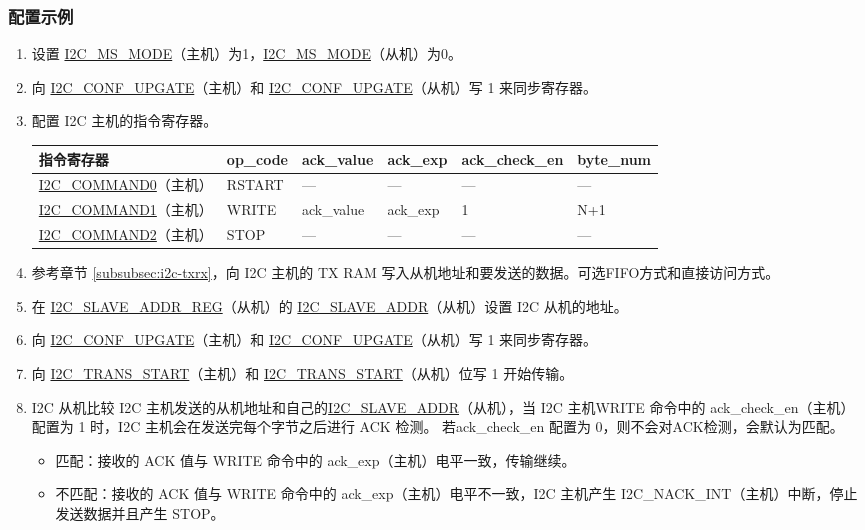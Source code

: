 \documentclass[main\_\_CN.tex]{subfiles}
\begin{document}
\subsubsection{配置示例}
\begin{enumerate}
\item 设置 \hyperref[fielddesc:I2CMSMODE]{I2C\_MS\_MODE}（主机）为1，\hyperref[fielddesc:I2CMSMODE]{I2C\_MS\_MODE}（从机）为0。
\item 向 \hyperref[fielddesc:I2CCONFUPGATE]{I2C\_CONF\_UPGATE}（主机）和 \hyperref[fielddesc:I2CCONFUPGATE]{I2C\_CONF\_UPGATE}（从机）写 1 来同步寄存器。
\clearpage
\item 配置 I2C 主机的指令寄存器。
\begin{longtable}{ | p{4cm} | p{2cm} | p{2cm} | p{2cm} |p{2cm} | p{2cm} |}
\hline\rowcolor{lightgray}
指令寄存器& op\_code & ack\_value&ack\_exp&ack\_check\_en&byte\_num  \\ \hline
\hyperref[fielddesc:I2CCOMMAND0]{I2C\_COMMAND0}（主机）& RSTART& ---&---&---&---  \\ \hline
\hyperref[fielddesc:I2CCOMMAND1]{I2C\_COMMAND1}（主机）& WRITE& ack\_value&ack\_exp&1&N+1  \\ \hline
\hyperref[fielddesc:I2CCOMMAND2]{I2C\_COMMAND2}（主机）& STOP& ---&---&---&---  \\ \hline
\end{longtable}
\item 参考章节 \ref{subsubsec:i2c-txrx}，向 I2C 主机的 TX RAM 写入从机地址和要发送的数据。可选FIFO方式和直接访问方式。
\item 在 \hyperref[regdesc:I2CSLAVEADDRREG]{I2C\_SLAVE\_ADDR\_REG}（从机）的 \hyperref[fielddesc:I2CSLAVEADDR]{I2C\_SLAVE\_ADDR}（从机）设置 I2C 从机的地址。
\item 向 \hyperref[fielddesc:I2CCONFUPGATE]{I2C\_CONF\_UPGATE}（主机）和 \hyperref[fielddesc:I2CCONFUPGATE]{I2C\_CONF\_UPGATE}（从机）写 1 来同步寄存器。
\item 向 \hyperref[fielddesc:I2CTRANSSTART]{I2C\_TRANS\_START}（主机）和 \hyperref[fielddesc:I2CTRANSSTART]{I2C\_TRANS\_START}（从机）位写 1 开始传输。
\item I2C 从机比较 I2C 主机发送的从机地址和自己的\hyperref[fielddesc:I2CSLAVEADDR]{I2C\_SLAVE\_ADDR}（从机），当 I2C 主机WRITE 命令中的 ack\_check\_en（主机）配置为 1 时，I2C 主机会在发送完每个字节之后进行 ACK 检测。 若ack\_check\_en 配置为 0，则不会对ACK检测，会默认为匹配。
\begin{itemize}
\item 匹配：接收的 ACK 值与 WRITE 命令中的 ack\_exp（主机）电平一致，传输继续。
\item 不匹配：接收的 ACK 值与 WRITE 命令中的 ack\_exp（主机）电平不一致，I2C 主机产生 I2C\_NACK\_INT（主机）中断，停止发送数据并且产生 STOP。
\end{itemize}


\end{enumerate}
\end{document}

